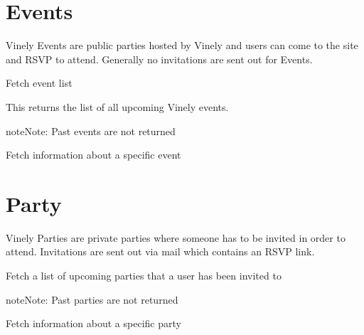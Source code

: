 \documentclass[letterpaper,10pt,english]{sphinxmanual}
\begin{document}
\section{Events}
\label{parties:events}
Vinely Events are public parties hosted by Vinely and users can come to the site and RSVP to attend.
Generally no invitations are sent out for Events.

Fetch event list


\begin{fulllineitems}
\label{parties:get--api-v1-event-}
\end{fulllineitems}


This returns the list of all upcoming Vinely events.

\begin{notice}{note}{Note:}
Past events are not returned
\end{notice}

Fetch information about a specific event


\begin{fulllineitems}
\label{parties:get--api-v1-event-_id_-}
\end{fulllineitems}



\section{Party}
\label{parties:party}
Vinely Parties are private parties where someone has to be invited in order to attend.
Invitations are sent out via mail which contains an RSVP link.

Fetch a list of upcoming parties that a user has been invited to


\begin{fulllineitems}
\label{parties:get--api-v1-party-}
\end{fulllineitems}


\begin{notice}{note}{Note:}
Past parties are not returned
\end{notice}

Fetch information about a specific party


\begin{fulllineitems}
\label{parties:get--api-v1-party-_id_-}
\end{fulllineitems}
\end{document}
